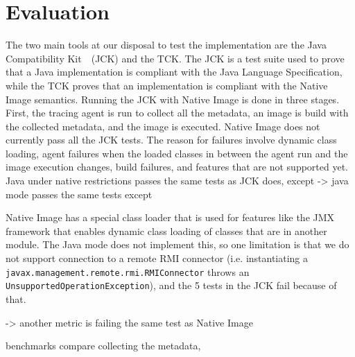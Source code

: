 \chapter{Evaluation}
The two main tools at our disposal to test the implementation are the Java Compatibility Kit~\cite{noauthor_gaining_nodate}~(JCK) and the TCK.
The JCK is a test suite used to prove that a Java implementation is compliant with the Java Language Specification, while the TCK proves that an implementation is compliant with
the Native Image semantics.
Running the JCK with Native Image is done in three stages. First, the tracing agent is run to collect all the metadata, an image is build with the collected metadata, and the image is executed. 
Native Image does not currently pass all the JCK tests. The reason for failures involve dynamic class loading, agent failures when the loaded classes in between the agent run and the image execution changes, build failures, and features that are not supported yet.
Java under native restrictions passes the same tests as JCK does, except  
-> java mode passes the same tests except

Native Image has a special class loader that is used for features like the JMX framework that enables dynamic class loading of classes that are in another module. The Java mode does not implement this, so one limitation is that we do not support connection to a remote RMI connector (i.e. instantiating a \verb|javax.management.remote.rmi.RMIConnector| throws an \verb|UnsupportedOperationException|), and the 5 tests in the JCK fail because of that.

-> another metric is failing the same test as Native Image

benchmarks compare collecting the metadata, 
